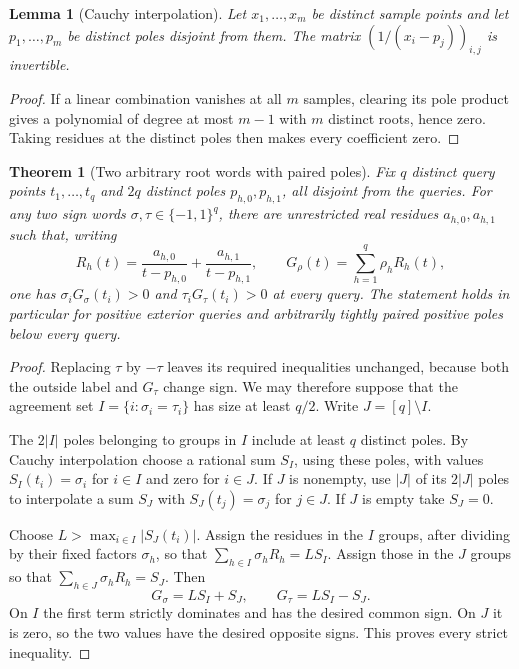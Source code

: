 \documentclass[11pt]{article}
\newtheorem{theorem}{Theorem}
\newtheorem{lemma}{Lemma}
\begin{document}
\begin{lemma}[Cauchy interpolation]
Let $x_1,\ldots,x_m$ be distinct sample points and let
$p_1,\ldots,p_m$ be distinct poles disjoint from them. The matrix
$(1/(x_i-p_j))_{i,j}$ is invertible.
\end{lemma}
\begin{proof}
If a linear combination vanishes at all $m$ samples, clearing its
pole product gives a polynomial of degree at most $m-1$ with $m$
distinct roots, hence zero. Taking residues at the distinct poles
then makes every coefficient zero.
\end{proof}

\begin{theorem}[Two arbitrary root words with paired poles]
Fix $q$ distinct query points $t_1,\ldots,t_q$ and $2q$ distinct poles
$p_{h,0},p_{h,1}$, all disjoint from the queries. For any two sign words
$\sigma,\tau\in\{-1,1\}^q$, there are unrestricted real residues
$a_{h,0},a_{h,1}$ such that, writing
\[
 R_h(t)=\frac{a_{h,0}}{t-p_{h,0}}+
        \frac{a_{h,1}}{t-p_{h,1}},\qquad
 G_\rho(t)=\sum_{h=1}^q\rho_h R_h(t),
\]
one has $\sigma_iG_\sigma(t_i)>0$ and
$\tau_iG_\tau(t_i)>0$ at every query.
The statement holds in particular for positive exterior queries and
arbitrarily tightly paired positive poles below every query.
\end{theorem}
\begin{proof}
Replacing $\tau$ by $-\tau$ leaves its required inequalities unchanged,
because both the outside label and $G_\tau$ change sign. We may therefore
suppose that the agreement set $I=\{i:\sigma_i=\tau_i\}$ has size at
least $q/2$. Write $J=[q]\setminus I$.

The $2|I|$ poles belonging to groups in $I$ include at least $q$ distinct
poles. By Cauchy interpolation choose a rational sum $S_I$, using these
poles, with values $S_I(t_i)=\sigma_i$ for $i\in I$ and zero for
$i\in J$. If $J$ is nonempty, use $|J|$ of its $2|J|$ poles to
interpolate a sum $S_J$ with $S_J(t_j)=\sigma_j$ for $j\in J$.
If $J$ is empty take $S_J=0$.

Choose $L>\max_{i\in I}|S_J(t_i)|$. Assign the residues in the $I$
groups, after dividing by their fixed factors $\sigma_h$, so that
$\sum_{h\in I}\sigma_hR_h=L S_I$. Assign those in the $J$ groups so
that $\sum_{h\in J}\sigma_hR_h=S_J$. Then
\[
 G_\sigma=L S_I+S_J,\qquad G_\tau=L S_I-S_J.
\]
On $I$ the first term strictly dominates and has the desired common
sign. On $J$ it is zero, so the two values have the desired opposite
signs. This proves every strict inequality.
\end{proof}
\end{document}
